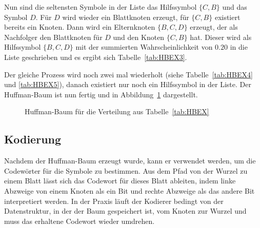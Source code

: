 \documentclass[twoside,11pt,a4paper]{article}
\theoremstyle{break}
\begin{document}
Nun sind die seltensten Symbole in der Liste das Hilfssymbol $\{C,
B\}$ und das Symbol $D$. Für $D$ wird wieder ein Blattknoten erzeugt,
für $\{C, B\}$ existiert bereits ein Knoten. Dann wird ein
Elternknoten $\{B, C, D\}$ erzeugt, der als Nachfolger den Blattknoten
für $D$ und den Knoten $\{C, B\}$ hat. Dieser wird als Hilfssymbol
$\{B, C, D\}$ mit der summierten Wahrscheinlichkeit von $0.20$ in die
Liste geschrieben und es ergibt sich Tabelle~\ref{tab:HBEX3}.

Der gleiche Prozess wird noch zwei mal wiederholt (siehe
Tabelle~\ref{tab:HBEX4} und \ref{tab:HBEX5}), danach existiert nur
noch ein Hilfssymbol in der Liste. Der Huffman-Baum ist nun fertig
und in Abbildung~\ref{fig:HBEX} dargestellt.

\begin{figure}[h]
\centering
{}
\caption{Huffman-Baum für die Verteilung aus Tabelle~\ref{tab:HBEX}} \label{fig:HBEX}
\end{figure}

\subsection{Kodierung}
Nachdem der Huffman-Baum erzeugt wurde, kann er verwendet werden, um
die Codewörter für die Symbole zu bestimmen. Aus dem Pfad von der
Wurzel zu einem Blatt lässt sich das Codewort für dieses Blatt
ableiten, indem linke Abzweige von einem Knoten als ein Bit und rechte
Abzweige als das andere Bit interpretiert werden. In der Praxis läuft
der Kodierer bedingt von der Datenstruktur, in der der Baum gespeichert
ist, vom Knoten zur Wurzel und muss das erhaltene Codewort wieder
umdrehen.
\end{document}
